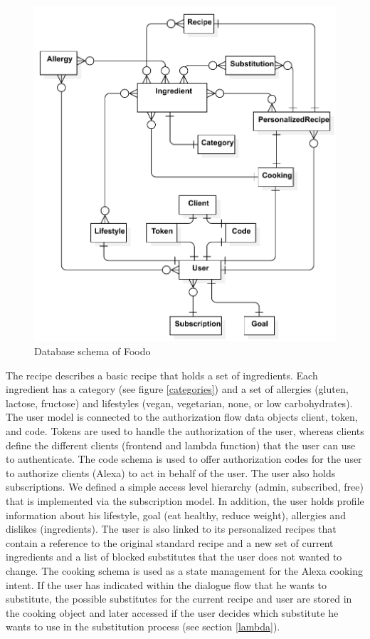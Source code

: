 \begin{figure}[ht]
	\captionsetup{justification=centering}
	\begin{center}
		\includegraphics[scale=0.7]{Ressourcen/img/db}
		\caption{Database schema of Foodo}
	\end{center}
\end{figure}


The recipe describes a basic recipe that holds a set of ingredients. Each ingredient has a category (see figure \ref{categories}) and a set of allergies (gluten, lactose, fructose) and lifestyles (vegan, vegetarian, none, or low carbohydrates). The user model is connected to the authorization flow data objects client, token, and code. Tokens are used to handle the authorization of the user, whereas clients define the different clients (frontend and lambda function) that the user can use to authenticate. The code schema is used to offer authorization codes for the user to authorize clients (Alexa) to act in behalf of the user. The user also holds subscriptions. We defined a simple access level hierarchy (admin, subscribed, free) that is implemented via the subscription model. In addition, the user holds profile information about his lifestyle, goal (eat healthy, reduce weight), allergies and dislikes (ingredients). The user is also linked to its personalized recipes that contain a reference to the original standard recipe and a new set of current ingredients and a list of blocked substitutes that the user does not wanted to change. The cooking schema is used as a state management for the Alexa cooking intent. If the user has indicated within the dialogue flow that he wants to substitute, the possible substitutes for the current recipe and user are stored in the cooking object and later accessed if the user decides which substitute he wants to use in the substitution process (see section \ref{lambda}).

